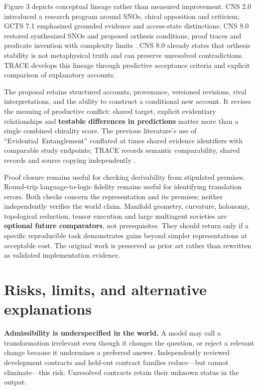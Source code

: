 \documentclass[11pt,a4paper]{article}
\begin{document}
Figure 3 depicts conceptual lineage rather than measured improvement.
CNS 2.0 introduced a research program around SNOs, chiral opposition and
criticism; GCTS 7.1 emphasized grounded evidence and access-state
distinctions; CNS 8.0 restored synthesized SNOs and proposed orthesis
conditions, proof traces and predicate invention with complexity limits
\citep{G13, G11, G02, G09}. CNS 8.0 already states that orthesis
stability is not metaphysical truth and can preserve unresolved
contradictions. TRACE develops this lineage through predictive
acceptance criteria and explicit comparison of explanatory accounts.

The proposal retains structured accounts, provenance, versioned
revisions, rival interpretations, and the ability to construct a
conditional new account. It revises the meaning of productive conflict:
shared target, explicit evidentiary relationships and \textbf{testable
differences in predictions} matter more than a single combined chirality
score. The previous literature's use of ``Evidential~Entanglement''
conflated at times shared evidence identifiers with comparable study
endpoints; TRACE records semantic comparability, shared records and
source copying independently \citep{G09}.

Proof closure remains useful for checking derivability from stipulated
premises. Round-trip language-to-logic fidelity remains useful for
identifying translation errors. Both checks concern the representation
and its premises; neither independently verifies the world claim.
Manifold geometry, curvature, holonomy, topological reduction, tensor
execution and large multiagent societies are \textbf{optional future
comparators}, not prerequisites. They should return only if a specific
reproducible task demonstrates gains beyond simpler representations at
acceptable cost. The original work is preserved as prior art rather than
rewritten as validated implementation evidence.

\section{Risks, limits, and alternative
explanations}\label{risks-limits-and-alternative-explanations}

\textbf{Admissibility is underspecified in the world.} A model may call
a transformation irrelevant even though it changes the question, or
reject a relevant change because it undermines a preferred answer.
Independently reviewed development contracts and held-out contract
families reduce---but cannot eliminate---this risk. Unresolved contracts
retain their unknown status in the output.
\end{document}
